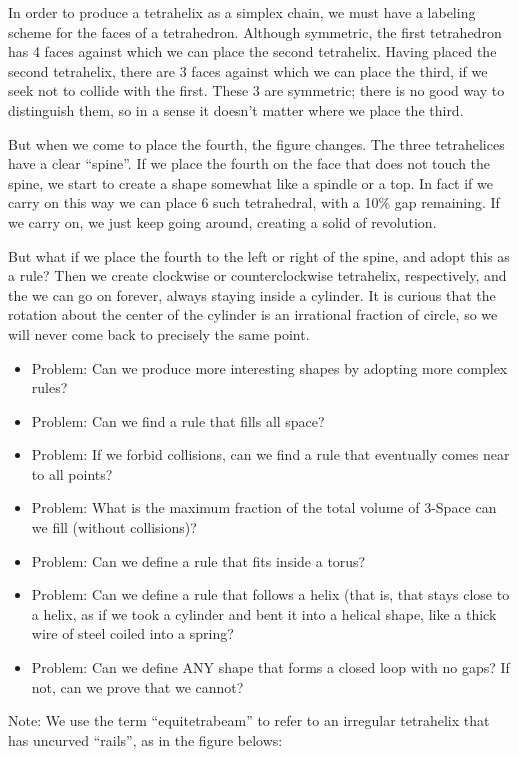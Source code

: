 \documentclass[11pt]{article}
\begin{document}
In order to produce a tetrahelix as a simplex chain, we must have a labeling scheme for the faces of a tetrahedron.
Although symmetric, the first tetrahedron has 4 faces against which we can place the second tetrahelix.
Having placed the second tetrahelix, there are 3 faces against which we can place the third, if we
seek not to collide with the first. These 3 are symmetric; there is no good way to distinguish them,
so in a sense it doesn't matter where we place the third.

But when we come to place the fourth, the figure changes. The three tetrahelices have a clear ``spine''. If we
place the fourth on the face that does not touch the spine, we start to create a shape somewhat like a spindle or a top.
In fact if we carry on this way we can place 6 such tetrahedral, with a 10\% gap remaining. If we carry on, we just keep
going around, creating a solid of revolution.

But what if we place the fourth to the left or right of the spine, and adopt this as a rule? Then we create
clockwise or counterclockwise tetrahelix, respectively, and the we can go on forever, always staying inside a cylinder.
It is curious that the rotation about the center of the cylinder is an irrational fraction of circle, so we will
never come back to precisely the same point.

\begin{itemize}
\item Problem: Can we produce more interesting shapes by adopting more complex rules?
\item Problem: Can we find a rule that fills all space?
\item Problem: If we forbid collisions, can we find a rule that eventually comes near to all points?
\item Problem: What is the maximum fraction of the total volume of 3-Space can we fill (without collisions)?
\item Problem: Can we define a rule that fits inside a torus?
\item Problem: Can we define a rule that follows a helix (that is, that stays close to a helix, as if we took a cylinder and bent it into a helical shape, like a thick wire of
steel coiled into a spring?
\item Problem: Can we define ANY shape that forms a closed loop with no gaps? If not, can we prove that we cannot?
\end{itemize}

Note: We use the term ``equitetrabeam'' to refer to an irregular tetrahelix that has uncurved ``rails'', as in the figure belows:
\end{document}
